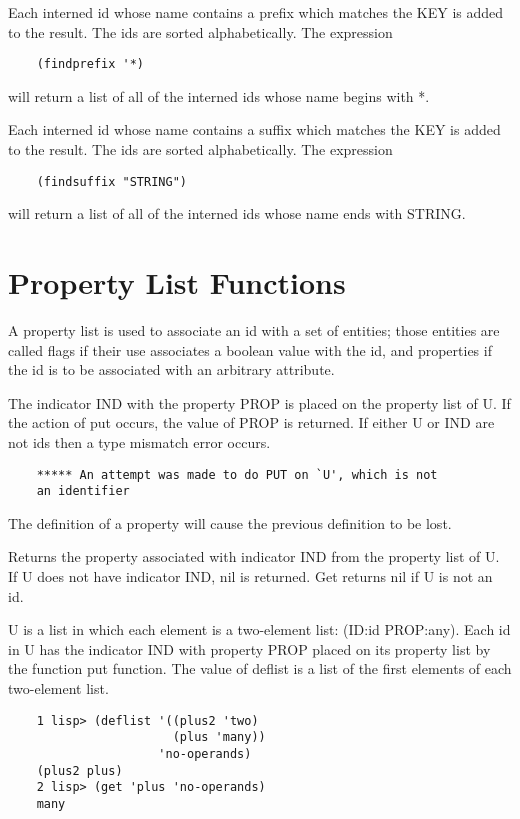 {    Each  interned id whose name contains a prefix which matches
    the KEY is  added  to  the  result.    The  ids  are  sorted
    alphabetically.  The expression
}
\begin{verbatim}
    (findprefix '*)
\end{verbatim}
    will  return  a  list  of all of the interned ids whose name
    begins with *.


{    Each interned id whose name contains a suffix which  matches
    the  KEY  is  added  to  the  result.    The  ids are sorted
    alphabetically.  The expression
}
\begin{verbatim}
    (findsuffix "STRING")
\end{verbatim}
    will return a list of all of the  interned  ids  whose  name
    ends with STRING.

\section{Property List Functions}

A  property  list  is  used  to  associate an id with a set of
entities;  those  entities  are  called  flags  if   their   use
associates a boolean value with the id, and properties if the id
is to be associated with an arbitrary attribute.


{    The  indicator  IND with the property PROP is placed on  the
    property list of U.  If the action of put occurs, the  value
    of  PROP is returned.  If either U or IND are not ids then a
    type mismatch error occurs.
}
\begin{verbatim}
    ***** An attempt was made to do PUT on `U', which is not  
    an identifier
\end{verbatim}
    The  definition  of  a  property  will  cause  the  previous
    definition to be lost.

{    Returns the  property associated with indicator IND from the
    property list of U.  If U does not have indicator  IND,  nil
    is returned.  Get returns nil if U is not an id.
}

{    U  is  a  list  in which each element is a two-element list:
    (ID:id PROP:any).  Each id in U has the indicator  IND  with
    property  PROP  placed  on its property list by the function
    put function.  The value of deflist is a list of  the  first
    elements of each two-element list.
}
\begin{verbatim}
    1 lisp> (deflist '((plus2 'two)
                       (plus 'many))
                     'no-operands)
    (plus2 plus)
    2 lisp> (get 'plus 'no-operands)
    many
\end{verbatim}

